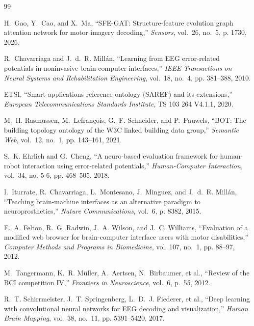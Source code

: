 \documentclass[12pt,a4paper]{report}
\begin{document}
\newpage
\begin{thebibliography}{99}

H.~Gao, Y.~Cao, and X.~Ma, ``SFE-GAT: Structure-feature evolution graph attention network for motor imagery decoding,'' \emph{Sensors}, vol.~26, no.~5, p. 1730, 2026.

R.~Chavarriaga and J.~d.~R. Mill\'{a}n, ``Learning from EEG error-related potentials in noninvasive brain-computer interfaces,'' \emph{IEEE Transactions on Neural Systems and Rehabilitation Engineering}, vol.~18, no.~4, pp. 381--388, 2010.

ETSI, ``Smart applications reference ontology (SAREF) and its extensions,'' \emph{European Telecommunications Standards Institute}, TS 103 264 V4.1.1, 2020.

M.~H. Rasmussen, M.~Lefran\c{c}ois, G.~F. Schneider, and P.~Pauwels, ``BOT: The building topology ontology of the W3C linked building data group,'' \emph{Semantic Web}, vol.~12, no.~1, pp. 143--161, 2021.

S.~K. Ehrlich and G.~Cheng, ``A neuro-based evaluation framework for human-robot interaction using error-related potentials,'' \emph{Human-Computer Interaction}, vol.~34, no. 5-6, pp. 468--505, 2018.

I.~Iturrate, R.~Chavarriaga, L.~Montesano, J.~Minguez, and J.~d.~R. Mill\'{a}n, ``Teaching brain-machine interfaces as an alternative paradigm to neuroprosthetics,'' \emph{Nature Communications}, vol.~6, p. 8382, 2015.

E.~A. Felton, R.~G. Radwin, J.~A. Wilson, and J.~C. Williams, ``Evaluation of a modified web browser for brain-computer interface users with motor disabilities,'' \emph{Computer Methods and Programs in Biomedicine}, vol. 107, no.~1, pp. 88--97, 2012.

M.~Tangermann, K.~R. M\"{u}ller, A.~Aertsen, N.~Birbaumer, et al., ``Review of the BCI competition IV,'' \emph{Frontiers in Neuroscience}, vol.~6, p.~55, 2012.

R.~T. Schirrmeister, J.~T. Springenberg, L.~D.~J. Fiederer, et al., ``Deep learning with convolutional neural networks for EEG decoding and visualization,'' \emph{Human Brain Mapping}, vol.~38, no.~11, pp. 5391--5420, 2017.


\end{thebibliography}
\end{document}
